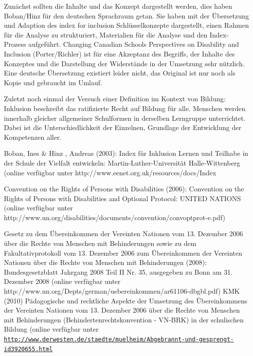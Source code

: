 Zunächst sollten die Inhalte und das Konzept dargestellt werden, dies haben Boban/Hinz für den deutschen Sprachraum getan. Sie haben mit der Übersetzung und Adaption des index for inclusion Schlüsselkonzepte dargestellt, einen Rahmen für die Analyse zu strukturiert, Mater­ial­ien für die Analyse und den Index-Prozess auf­geführt.
Changing Canadian Schools Perspectives on Disability and Inclusion (Porter/Richler) ist für eine Akzeptanz des Begriffs, der Inhalte des Konzeptes und die Darstellung der Widerstände in der Um­setzung sehr nützlich. Eine deutsche Übersetzung existiert leider nicht, das Original ist nur noch als Kopie und ge­braucht im Um­lauf.

Zuletzt noch einmal der Versuch einer Definition im Kontext von Bildung:
Inklusion beschreibt das ratifizierte Recht auf Bildung für alle. Menschen werden inner­halb gleicher allgemeiner Schulformen in der­selben Lerngruppe unterrichtet. Dabei ist die Unterschiedlichkeit der Einzelnen, Grund­lage der Entwicklung der Kompetenzen aller.

Boban, Ines \& Hinz , Andreas (2003): Index für Inklusion Lernen und Teilhabe in der Schule der Vielfalt entwickeln: Martin-Luther-Universität Halle-Wittenberg 
(online verfügbar unter http://www.eenet.org.uk/resources/docs/Index%

Convention on the Rights of Persons with Disabilities (2006): Convention on the Rights of Persons with Disabilities and Optional Protocol: UNITED NATIONS 
(online verfügbar unter http://www.un.org/disabilities/documents/convention/convoptprot-e.pdf)

Gesetz zu dem Übereinkommen der Vereinten Nationen vom 13. Dezember 2006 über die Rechte von Menschen mit Behinderungen sowie zu dem Fakultativprotokoll vom 13. Dezember 2006 zum Übereinkommen der Vereinten Nationen über die Rechte von Menschen mit Behinderungen (2008): Bundesgesetzblatt Jahrgang 2008 Teil II Nr. 35, ausgegeben zu Bonn am 31. Dezember 2008 
(online verfügbar unter http://www.un.org/Depts/german/uebereinkommen/ar61106-dbgbl.pdf)
KMK (2010) Pädagogische und rechtliche Aspekte der Umsetzung des Übereinkommens der Vereinten Nationen vom 13. Dezember 2006 über die Rechte von Menschen mit Behinderungen (Behindertenrechtskonvention - VN-BRK) in der schulischen Bildung
(online verfügbar unter\\
{\href{http://www.derwesten.de/staedte/muelheim/Abgebrannt-und-gesprengt-id3920655.html}{\nolinkurl{http://www.derwesten.de/staedte/muelheim/Abgebrannt-und-gesprengt-id3920655.html
}}}\\
\href{http://www.kmk.org/fileadmin/veroeffentlichungen_beschluesse/2010/2010_11_18-Behindertenrechtkonvention.pdf)}\\


